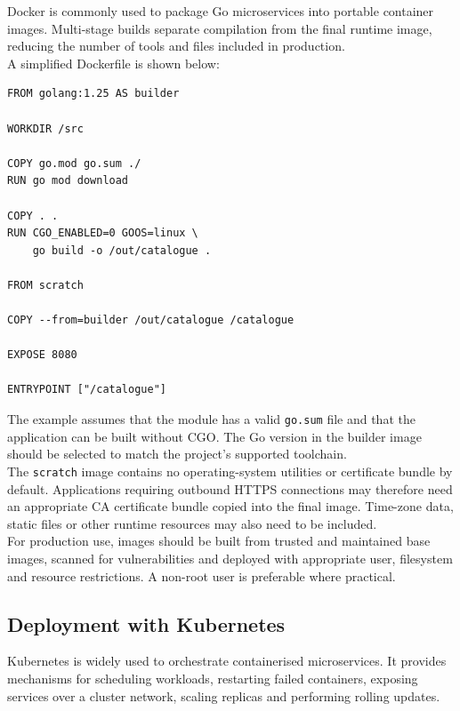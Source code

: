 Docker is commonly used to package Go microservices into portable container images. Multi-stage builds separate compilation from the final runtime image, reducing the number of tools and files included in production.\\

A simplified Dockerfile is shown below:

\begin{lstlisting}
FROM golang:1.25 AS builder

WORKDIR /src

COPY go.mod go.sum ./
RUN go mod download

COPY . .
RUN CGO_ENABLED=0 GOOS=linux \
    go build -o /out/catalogue .

FROM scratch

COPY --from=builder /out/catalogue /catalogue

EXPOSE 8080

ENTRYPOINT ["/catalogue"]
\end{lstlisting}

The example assumes that the module has a valid \texttt{go.sum} file and that the application can be built without CGO. The Go version in the builder image should be selected to match the project's supported toolchain.\\

The \texttt{scratch} image contains no operating-system utilities or certificate bundle by default. Applications requiring outbound HTTPS connections may therefore need an appropriate CA certificate bundle copied into the final image. Time-zone data, static files or other runtime resources may also need to be included.\\

For production use, images should be built from trusted and maintained base images, scanned for vulnerabilities and deployed with appropriate user, filesystem and resource restrictions. A non-root user is preferable where practical.

\subsection{Deployment with Kubernetes}

Kubernetes is widely used to orchestrate containerised microservices. It provides mechanisms for scheduling workloads, restarting failed containers, exposing services over a cluster network, scaling replicas and performing rolling updates.\\

